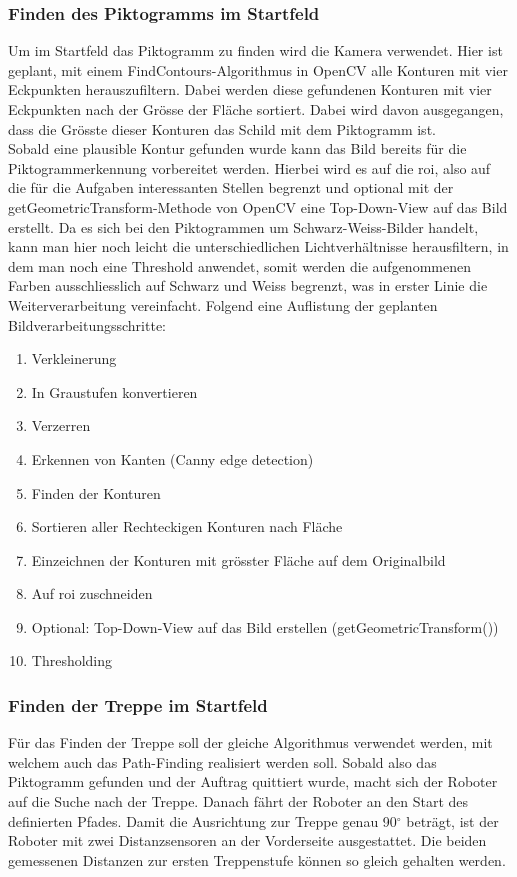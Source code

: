 \subsubsection{Finden des Piktogramms im Startfeld}
\label{sec:piktogramm-finden-im-startfeld}
Um im Startfeld das Piktogramm zu finden wird die Kamera verwendet. Hier ist geplant, mit einem FindContours-Algorithmus \cite{OpenCV-Fining-Contours} in OpenCV alle Konturen mit vier Eckpunkten herauszufiltern. Dabei werden diese gefundenen Konturen mit vier Eckpunkten nach der Grösse der Fläche sortiert. Dabei wird davon ausgegangen, dass die Grösste dieser Konturen das Schild mit dem Piktogramm ist.\\ 
Sobald eine plausible Kontur gefunden wurde kann das Bild bereits für die Piktogrammerkennung vorbereitet werden. Hierbei wird es auf die \acrfull{roi}, also auf die für die Aufgaben interessanten Stellen begrenzt und optional mit der getGeometricTransform-Methode von OpenCV eine Top-Down-View auf das Bild erstellt. Da es sich bei den Piktogrammen um Schwarz-Weiss-Bilder handelt, kann man hier noch leicht die unterschiedlichen Lichtverhältnisse herausfiltern, in dem man noch eine Threshold anwendet, somit werden die aufgenommenen Farben ausschliesslich auf Schwarz und Weiss begrenzt, was in erster Linie die Weiterverarbeitung vereinfacht.
Folgend eine Auflistung der geplanten Bildverarbeitungsschritte:
\begin{enumerate}
    \item Verkleinerung
    \item In Graustufen konvertieren 
    \item Verzerren
    \item Erkennen von Kanten (Canny edge detection)
    \item Finden der Konturen
    \item Sortieren aller Rechteckigen Konturen nach Fläche
    \item Einzeichnen der Konturen mit grösster Fläche auf dem Originalbild
    \item Auf \acrshort{roi} zuschneiden
    \item Optional: Top-Down-View auf das Bild erstellen (getGeometricTransform())
    \item Thresholding
\end{enumerate}

\subsubsection{Finden der Treppe im Startfeld}
\label{sec:treppe-finden-im-startfeld}
Für das Finden der Treppe soll der gleiche Algorithmus verwendet werden, mit welchem auch das Path-Finding realisiert werden soll. Sobald also das Piktogramm gefunden und der Auftrag quittiert wurde, macht sich der Roboter auf die Suche nach der Treppe. Danach fährt der Roboter an den Start des definierten Pfades. Damit die Ausrichtung zur Treppe genau 90$^\circ$ beträgt, ist der Roboter mit zwei Distanzsensoren an der Vorderseite ausgestattet. Die beiden gemessenen Distanzen zur ersten Treppenstufe können so gleich gehalten werden.

